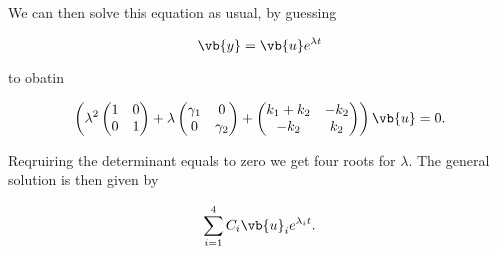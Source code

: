 \documentclass[english,a4paper,12pt]{report}
\begin{document}
We can then solve this equation as usual, by guessing

\begin{equation}
    \vb{y} = \vb{u} e^{\lambda t} 
\end{equation}

to obatin 

\begin{equation}
    \left( \lambda ^2 \begin{pmatrix}
        1 &  0 \\
        0 &  1 \\
    \end{pmatrix}+ \lambda \begin{pmatrix}
        \gamma _{1}  & 0  \\
        0 & \gamma _{2}   \\
    \end{pmatrix} + \begin{pmatrix}
        k_1 +k_2  &  -k_2  \\
        -k_2  &  k_2  \\
    \end{pmatrix} \right) \vb{u} = 0.
\end{equation}

Reqruiring the determinant equals to zero we get four roots for \(\lambda \). The general solution is then given by 

\begin{equation}
    \sum_{i=1}^{4} C_{i} \vb{u} _{i} e^{\lambda _{i}t }.   
\end{equation}
\end{document}
